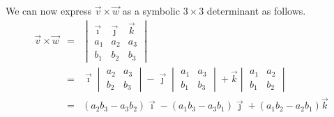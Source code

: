 We can now express $\vec{v} \times \vec{w}$ as a symbolic $3 \times 3$ determinant as follows.
\begin{eqnarray*}
\vec{v} \times \vec{w} & = & 
\begin{vmatrix}
\vec{\imath} & \vec{\jmath} & \vec{k} \\
a_1 & a_2 & a_3 \\
b_1 & b_2 & b_3 
\end{vmatrix} \\
& = &
\vec{\imath} \begin{vmatrix}
a_2 & a_3 \\
b_2 & b_3
\end{vmatrix}
-
\vec{\jmath} \begin{vmatrix}
a_1 & a_3 \\
b_1 & b_3
\end{vmatrix}
+
\vec{k} \begin{vmatrix}
a_1 & a_2 \\
b_1 & b_2
\end{vmatrix} \\
 & = & (a_2 b_3 - a_3 b_2) \vec{\imath} - (a_1 b_3 - a_3 b_1) \vec{\jmath} + (a_1 b_2 - a_2 b_1) \vec{k}
\end{eqnarray*}


